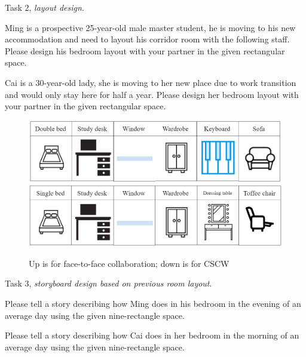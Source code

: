 \documentclass[12pt,twoside]{article}
\begin{document}
Task 2, \textit{layout design}.

Ming is a prospective 25-year-old male master student, he is moving to his new accommodation and need to layout his corridor room with the following staff. Please design his bedroom layout with your partner in the given rectangular space.

Cai is a 30-year-old lady, she is moving to her new place due to work transition and would only stay here for half a year. Please design her bedroom layout with your partner in the given rectangular space.

\begin{figure}
\centering
\includegraphics[scale=1]{img/user_task2_f2f.PNG}\\
\includegraphics[scale=1]{img/user_task2_CSCW.PNG}
\caption{Up is for face-to-face collaboration; down is for CSCW}
\end{figure}

Task 3, \textit{storyboard design based on previous room layout}.

Please tell a story describing how Ming does in his bedroom in the evening of an average day using the given nine-rectangle space.

Please tell a story describing how Cai does in her bedroom in the morning of an average day using the given nine-rectangle space.
\end{document}
